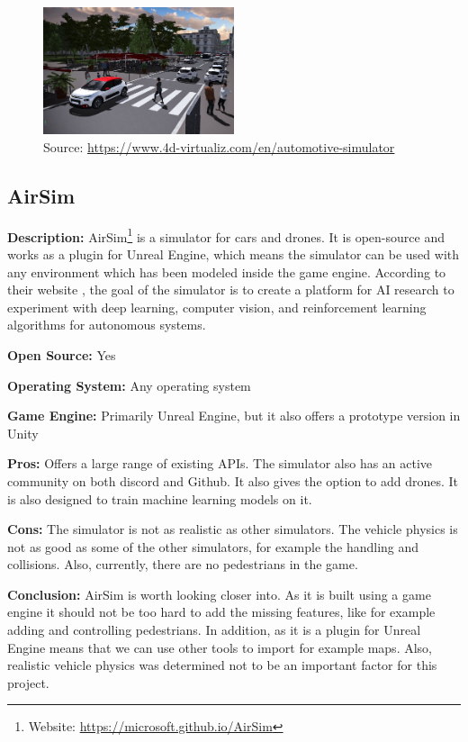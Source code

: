 \begin{figure}[H]
    \centering
    \includegraphics[width=0.5\textwidth]{Simulators/4DV-Sim.jpg}
    \caption{Source: \url{https://www.4d-virtualiz.com/en/automotive-simulator}}
\end{figure}

\subsection{AirSim} \label{AirSimDoc}
\textbf{Description:} AirSim\footnote{Website: \url{https://microsoft.github.io/AirSim}} is a simulator for cars and drones. It is open-source and works as a plugin for Unreal Engine, which means the simulator can be used with any environment which has been modeled inside the game engine. According to their website \cite{AirSim_Website}, the goal of the simulator is to create a platform for AI research to experiment with deep learning, computer vision, and reinforcement learning algorithms for autonomous systems. 

\textbf{Open Source:} Yes

\textbf{Operating System:} Any operating system

\textbf{Game Engine:} Primarily Unreal Engine, but it also offers a prototype version in Unity

\textbf{Pros:} Offers a large range of existing APIs. The simulator also has an active community on both discord and Github. It also gives the option to add drones. It is also designed to train machine learning models on it.

\textbf{Cons:} The simulator is not as realistic as other simulators. The vehicle physics is not as good as some of the other simulators, for example the handling and collisions. Also, currently, there are no pedestrians in the game. 

\textbf{Conclusion:} AirSim is worth looking closer into. As it is built using a game engine it should not be too hard to add the missing features, like for example adding and controlling pedestrians. In addition, as it is a plugin for Unreal Engine means that we can use other tools to import for example maps. Also, realistic vehicle physics was determined not to be an important factor for this project. 

